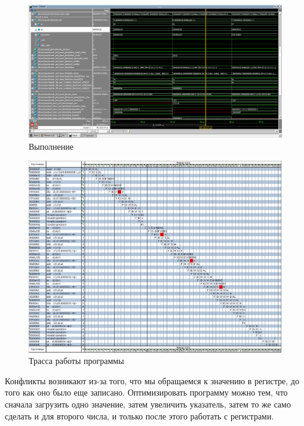 \begin{figure}[ht!]
\centering
\includegraphics[width=170mm]{./img/task5_3.png}
\caption{Выполнение \label{overflow}}
\end{figure}

\clearpage

\begin{figure}[ht!]
    \centering
    \includegraphics[width=170mm]{./img/trasa.png}
    \caption{Трасса работы программы\label{overflow}}
\end{figure}

Конфликты возникают из-за того, что мы обращаемся к значению в регистре, до того как оно было еще записано.
Оптимизировать программу можно тем, что сначала загрузить одно значение, затем увеличить указатель, затем то 
же само сделать и для второго числа, и только после этого работать с регистрами.

\clearpage

